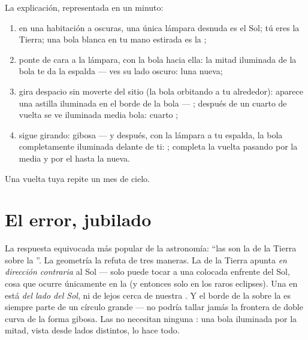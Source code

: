 \begin{method}\label{met:g7:moon-phases:walk}
La explicación, representada en un minuto:
\begin{enumerate}
  \item en una habitación a oscuras, una única lámpara desnuda es el
        Sol; tú eres la Tierra; una bola blanca en tu mano estirada
        es la ;
  \item ponte de cara a la lámpara, con la bola hacia ella: la mitad
        iluminada de la bola te da la espalda --- ves su lado oscuro:
        luna nueva;
  \item gira despacio sin moverte del sitio (la bola orbitando a tu
        alrededor): aparece una astilla iluminada en el borde de la
        bola --- ; después de un cuarto de vuelta se ve
        iluminada media bola: cuarto ;
  \item sigue girando: gibosa --- y después, con la lámpara a tu
        espalda, la bola completamente iluminada delante de ti:
        ; completa la vuelta pasando por la
         media y por el  hasta la nueva.
\end{enumerate}
Una vuelta tuya repite un mes de cielo.
\end{method}

\section{El error, jubilado}

\begin{proposition}\label{prop:g7:moon-phases:notshadow}
La respuesta equivocada más popular de la astronomía: ``las
 son la  de la Tierra sobre la ''. La
geometría la refuta de tres maneras. La  de la Tierra apunta
\emph{en dirección contraria} al Sol --- solo puede tocar a una
 colocada enfrente del Sol, cosa que ocurre únicamente en la
 (y entonces solo en los raros eclipses). Una
 en  está \emph{del lado del Sol}, ni de lejos
cerca de nuestra . Y el borde de la  sobre la
 es siempre parte de un círculo grande --- no podría tallar
jamás la frontera de doble curva de la forma gibosa. Las
 no necesitan ninguna : una bola iluminada por la
mitad, vista desde lados distintos, lo hace todo.
\end{proposition}

